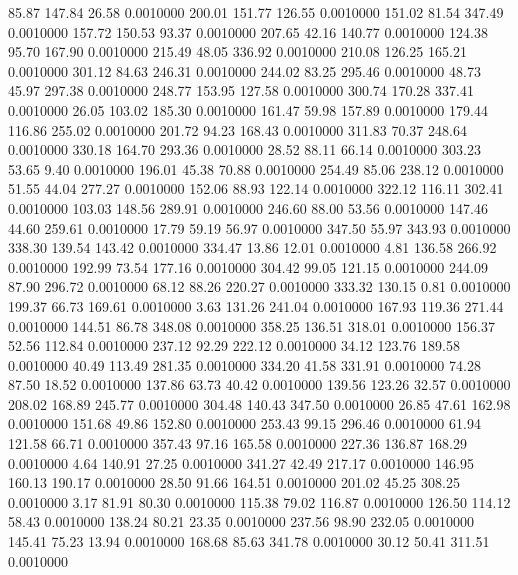   85.87  147.84   26.58   0.0010000
 200.01  151.77  126.55   0.0010000
 151.02   81.54  347.49   0.0010000
 157.72  150.53   93.37   0.0010000
 207.65   42.16  140.77   0.0010000
 124.38   95.70  167.90   0.0010000
 215.49   48.05  336.92   0.0010000
 210.08  126.25  165.21   0.0010000
 301.12   84.63  246.31   0.0010000
 244.02   83.25  295.46   0.0010000
  48.73   45.97  297.38   0.0010000
 248.77  153.95  127.58   0.0010000
 300.74  170.28  337.41   0.0010000
  26.05  103.02  185.30   0.0010000
 161.47   59.98  157.89   0.0010000
 179.44  116.86  255.02   0.0010000
 201.72   94.23  168.43   0.0010000
 311.83   70.37  248.64   0.0010000
 330.18  164.70  293.36   0.0010000
  28.52   88.11   66.14   0.0010000
 303.23   53.65    9.40   0.0010000
 196.01   45.38   70.88   0.0010000
 254.49   85.06  238.12   0.0010000
  51.55   44.04  277.27   0.0010000
 152.06   88.93  122.14   0.0010000
 322.12  116.11  302.41   0.0010000
 103.03  148.56  289.91   0.0010000
 246.60   88.00   53.56   0.0010000
 147.46   44.60  259.61   0.0010000
  17.79   59.19   56.97   0.0010000
 347.50   55.97  343.93   0.0010000
 338.30  139.54  143.42   0.0010000
 334.47   13.86   12.01   0.0010000
   4.81  136.58  266.92   0.0010000
 192.99   73.54  177.16   0.0010000
 304.42   99.05  121.15   0.0010000
 244.09   87.90  296.72   0.0010000
  68.12   88.26  220.27   0.0010000
 333.32  130.15    0.81   0.0010000
 199.37   66.73  169.61   0.0010000
   3.63  131.26  241.04   0.0010000
 167.93  119.36  271.44   0.0010000
 144.51   86.78  348.08   0.0010000
 358.25  136.51  318.01   0.0010000
 156.37   52.56  112.84   0.0010000
 237.12   92.29  222.12   0.0010000
  34.12  123.76  189.58   0.0010000
  40.49  113.49  281.35   0.0010000
 334.20   41.58  331.91   0.0010000
  74.28   87.50   18.52   0.0010000
 137.86   63.73   40.42   0.0010000
 139.56  123.26   32.57   0.0010000
 208.02  168.89  245.77   0.0010000
 304.48  140.43  347.50   0.0010000
  26.85   47.61  162.98   0.0010000
 151.68   49.86  152.80   0.0010000
 253.43   99.15  296.46   0.0010000
  61.94  121.58   66.71   0.0010000
 357.43   97.16  165.58   0.0010000
 227.36  136.87  168.29   0.0010000
   4.64  140.91   27.25   0.0010000
 341.27   42.49  217.17   0.0010000
 146.95  160.13  190.17   0.0010000
  28.50   91.66  164.51   0.0010000
 201.02   45.25  308.25   0.0010000
   3.17   81.91   80.30   0.0010000
 115.38   79.02  116.87   0.0010000
 126.50  114.12   58.43   0.0010000
 138.24   80.21   23.35   0.0010000
 237.56   98.90  232.05   0.0010000
 145.41   75.23   13.94   0.0010000
 168.68   85.63  341.78   0.0010000
  30.12   50.41  311.51   0.0010000
